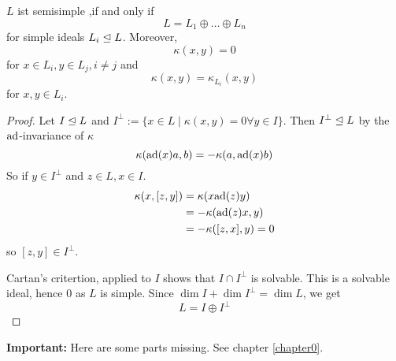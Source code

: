 \begin{theorem}
    $L$ ist semisimple ,if and only if
    $$ L = L_1 \oplus \ldots \oplus L_n $$
    for simple ideals $L_i \trianglelefteq L$. Moreover, 
    $$ \kappa(x,y) = 0$$ for $x \in L_i, y \in L_j, i \neq j$ and
    $$ \kappa(x,y) = \kappa_{L_i}(x,y)$$ for $x,y \in L_i$.
\end{theorem}
\begin{proof}
    Let $I \trianglelefteq L$ and $I^{\bot} := \{x \in L \mid \kappa(x,y) = 0 \forall y \in I\}$. 
    Then $I^\bot \trianglelefteq L$ by the $\text{ad}$-invariance of $\kappa$
    $$ \kappa(\text{ad}(x)a, b) = - \kappa(a, \text{ad}(x)b)$$
    So if $y \in I^\bot$ and $z \in L, x \in I$.
    \begin{align*}
        \kappa(x, [z,y]) &= \kappa(x \text{ad} (z) y)\\
        &= - \kappa(\text{ad}(z)x,y)\\
        &= - \kappa([z,x],y) = 0
    \end{align*}
    so $[z,y] \in I^\bot$.

    Cartan's critertion, applied to $I$ shows that $I \cap I^\bot$ is solvable.
    This is a solvable ideal, hence $0$ as $L$ is simple.
    Since $\dim I + \dim I^\bot = \dim L$, we get
    $$ L = I \oplus I^\bot$$
\end{proof}

\textbf{Important:} Here are some parts missing. See chapter \ref{chapter0}.